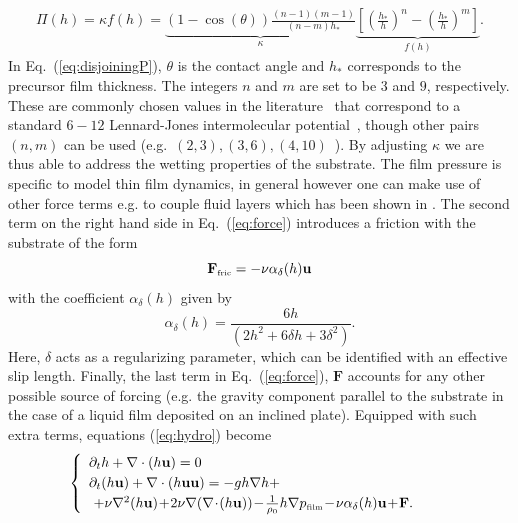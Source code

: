\begin{eqnarray}\label{eq:disjoiningP}
\Pi(h) = \kappa f(h) = \underbrace{(1 - \cos(\theta))\frac{(n-1)(m-1)}{(n-m)h_*}}_{\kappa}\underbrace{\left[\left(\frac{h_*}{h}\right)^n -\left(\frac{h_*}{h}\right)^m\right]}_{f(h)}.
\end{eqnarray}
In Eq.~(\ref{eq:disjoiningP}), $\theta$ is the contact angle and $h_*$
corresponds to the precursor film
thickness. The integers $n$ and $m$ are set to be $3$ and $9$, respectively. These 
are commonly chosen values in the literature~\cite{moulton_lega_2013,RevModPhys.69.931}
that correspond to a standard $6-12$ Lennard-Jones
intermolecular potential~\cite{fischer2018existence}, though other pairs
$(n,m)$ can be used (e.g.~$(2,3), (3,6), (4,10)$~\cite{1742-6596-166-1-012009,
PhysRevLett.119.204501, wedershoven2014infrared}). 
By adjusting $\kappa$ we are thus able to address the wetting properties of the substrate. 
The film pressure is specific to model thin film dynamics, in general however one can make use of other force terms e.g. to couple fluid layers which has been shown in \cite{doi:10.1002/fld.2742}. The second term on the right hand side in Eq.~(\ref{eq:force}) introduces
a friction with the substrate of the form
\begin{equation}\label{eq:forcefric}
\mathbf{F}_{\mbox{\tiny{fric}}} = -\nu \alpha_{\delta}(h)\mathbf{u}
\end{equation}
with the coefficient $\alpha_{\delta}(h)$ given by
\begin{equation}\label{eq:alphafric}
\alpha_{\delta}(h) = \frac{6h}{(2 h^2 + 6 \delta h + 3 \delta^2)}.
\end{equation}
Here, $\delta$ acts as a regularizing parameter, which can 
be identified with an effective slip length. 
Finally, the last term in Eq.~(\ref{eq:force}), $\mathbf{F}$ accounts for any other possible source
of forcing (e.g. the gravity component parallel to the substrate in the case of a liquid film
deposited on an inclined plate).
Equipped with such extra terms, equations (\ref{eq:hydro}) become
\begin{equation}\label{eq:hydro2}
\begin{cases}
\begin{array}{ll}
\partial_t h + \nabla \cdot (h \mathbf{u})  = 0 & \\ 
\partial_t (h \mathbf{u}) + \nabla \cdot (h \mathbf{u}\mathbf{u}) = -gh \nabla h  +\\ 
\,\, +  \nu \nabla^2 (h\mathbf{u}) \!+\! 2\nu \nabla (\nabla\! \cdot\! (h\mathbf{u}))
\!-\!\frac{1}{\rho_0}h\nabla p_{\mbox{\tiny{film}}} \!-\! \nu \alpha_{\delta}(h) \mathbf{u}\!+\! \mathbf{F}. 
\end{array}
\end{cases}
\end{equation}
